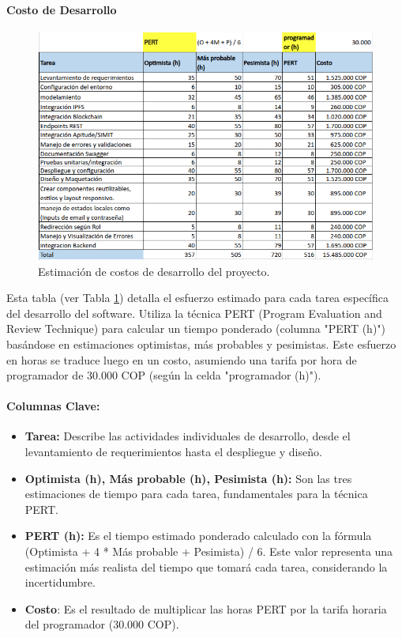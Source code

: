 \paragraph{Costo de Desarrollo }
\begin{figure}[htbp]
    \centering
    \includegraphics[width=\textwidth]{Images/costos3.png}
    \caption{Estimación de costos de desarrollo del proyecto.}
    \label{fig:costos3}
\end{figure}

Esta tabla (ver Tabla \ref{fig:costos3}) detalla el esfuerzo estimado para cada tarea específica del desarrollo del software. Utiliza la técnica PERT (Program Evaluation and Review Technique) para calcular un tiempo ponderado (columna "PERT (h)") basándose en estimaciones optimistas, más probables y pesimistas. Este esfuerzo en horas se traduce luego en un costo, asumiendo una tarifa por hora de programador de 30.000 COP (según la celda "programador (h)"). 
\paragraph{Columnas Clave: }
\begin{itemize}
\item \textbf{Tarea:} Describe las actividades individuales de desarrollo, desde el levantamiento de requerimientos hasta el despliegue y diseño. 

\item \textbf{Optimista (h), Más probable (h), Pesimista (h):} Son las tres estimaciones de tiempo para cada tarea, fundamentales para la técnica PERT. 

\item \textbf{PERT (h): }Es el tiempo estimado ponderado calculado con la fórmula (Optimista + 4 * Más probable + Pesimista) / 6. Este valor representa una estimación más realista del tiempo que tomará cada tarea, considerando la incertidumbre. 

\item \textbf{Costo}: Es el resultado de multiplicar las horas PERT por la tarifa horaria del programador (30.000 COP). 
\end{itemize}
 

